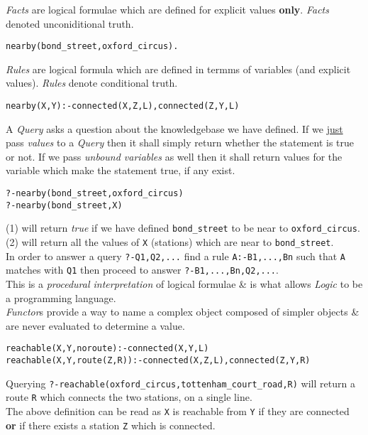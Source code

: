 \documentclass[11pt,a4paper]{article}
\begin{document}
\textit{Facts} are logical formulae which are defined for explicit values \textbf{only}. \textit{Facts} denoted unconiditional truth.
\begin{center}{\lstinline!nearby(bond_street,oxford_circus).!}\end{center}
\textit{Rules} are logical formula which are defined in termms of variables (and explicit values). \textit{Rules} denote conditional truth.
\begin{center}{\lstinline!nearby(X,Y):-connected(X,Z,L),connected(Z,Y,L)!}\end{center}

A \textit{Query} asks a question about the knowledgebase we have defined. If we \underline{just} pass \textit{values} to a \textit{Query} then it shall simply return whether the statement is true or not. If we pass \textit{unbound variables} as well then it shall return values for the variable which make the statement true, if any exist.\\

\begin{lstlisting}
?-nearby(bond_street,oxford_circus)
?-nearby(bond_street,X)
\end{lstlisting}
(1) will return \textit{true} if we have defined \lstinline!bond_street! to be near to \lstinline!oxford_circus!.\\
(2) will return all the values of \lstinline!X! (\ie stations) which are near to \lstinline!bond_street!.\\

In order to answer a query \lstinline!?-Q1,Q2,...! find a rule \lstinline!A:-B1,...,Bn! such that \lstinline!A! matches with \lstinline!Q1! then proceed to answer \lstinline!?-B1,...,Bn,Q2,...!.\\
This is a \textit{procedural interpretation} of logical formulae \& is what allows \textit{Logic} to be a programming language.\\

\textit{Functor}s provide a way to name a complex object composed of simpler objects \& are never evaluated to determine a value.
\begin{lstlisting}
reachable(X,Y,noroute):-connected(X,Y,L)
reachable(X,Y,route(Z,R)):-connected(X,Z,L),connected(Z,Y,R)
\end{lstlisting}
Querying \lstinline!?-reachable(oxford_circus,tottenham_court_road,R)! will return a route \lstinline!R! which connects the two stations, on a single line.\\
The above definition can be read as \lstinline!X! is reachable from \lstinline!Y! if they are connected \textbf{or} if there exists a station \lstinline!Z! which is connected.\\
\end{document}
